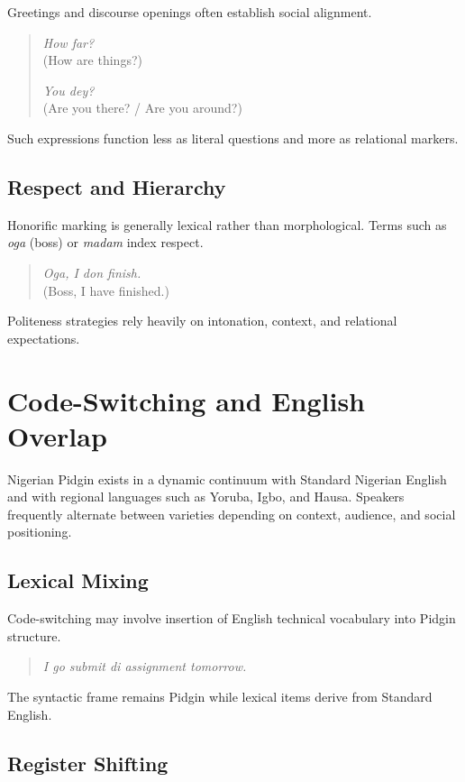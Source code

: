 \documentclass[12pt]{article}
\begin{document}
Greetings and discourse openings often establish social alignment.

\begin{quote}
\textit{How far?} \\
(How are things?)

\textit{You dey?} \\
(Are you there? / Are you around?)
\end{quote}

Such expressions function less as literal questions and more as relational markers.

\subsection{Respect and Hierarchy}

Honorific marking is generally lexical rather than morphological. Terms such as \textit{oga} (boss) or \textit{madam} index respect.

\begin{quote}
\textit{Oga, I don finish.} \\
(Boss, I have finished.)
\end{quote}

Politeness strategies rely heavily on intonation, context, and relational expectations.

\section{Code-Switching and English Overlap}

Nigerian Pidgin exists in a dynamic continuum with Standard Nigerian English and with regional languages such as Yoruba, Igbo, and Hausa. Speakers frequently alternate between varieties depending on context, audience, and social positioning.

\subsection{Lexical Mixing}

Code-switching may involve insertion of English technical vocabulary into Pidgin structure.

\begin{quote}
\textit{I go submit di assignment tomorrow.}
\end{quote}

The syntactic frame remains Pidgin while lexical items derive from Standard English.

\subsection{Register Shifting}
\end{document}
